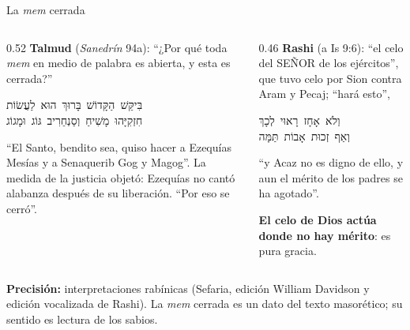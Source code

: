 \documentclass[hyperref={bookmarks=false},aspectratio=169]{beamer}
\newcommand{\heb}[1]{\mbox{\foreignlanguage{hebrew}{#1}}}
\newcommand{\SENOR}{S{\fontsize{0.78em}{1em}\selectfont EÑOR}}
\newcommand{\destacar}[1]{\textbf{\textcolor{azul}{#1}}}
\newcommand{\precision}[1]{{\footnotesize\color{gris}\textbf{Precisión:} #1}}
\begin{document}
\begin{frame}{La \emph{mem} cerrada}
\begin{columns}[t,onlytextwidth]
\begin{column}{0.52\textwidth}\small
\textbf{Talmud} (\emph{Sanedrín} 94a): ``¿Por qué toda \emph{mem} en medio de palabra es abierta, y esta es cerrada?''
\begin{center}\heb{בִּיקֵּשׁ הַקָּדוֹשׁ בָּרוּךְ הוּא לַעֲשׂוֹת}\\ \heb{חִזְקִיָּהוּ מָשִׁיחַ וְסַנְחֵרִיב גּוֹג וּמָגוֹג}\end{center}
``El Santo, bendito sea, quiso hacer a Ezequías Mesías y a Senaquerib Gog y Magog''. La medida de la justicia objetó: Ezequías no cantó alabanza después de su liberación. ``Por eso se cerró''.
\end{column}
\begin{column}{0.46\textwidth}\small
\textbf{Rashi} (a Is 9:6): ``el celo del \SENOR{} de los ejércitos'', que tuvo celo por Sion contra Aram y Pecaj; ``hará esto'',
\begin{center}\heb{וְלֹא אָחָז רָאוּי לְכָךְ}\\ \heb{וְאַף זְכוּת אָבוֹת תַּמָּה}\end{center}
``y Acaz no es digno de ello, y aun el mérito de los padres se ha agotado''.\par\smallskip
\destacar{El celo de Dios actúa donde no hay mérito}: es pura gracia.
\end{column}
\end{columns}\par\smallskip
\precision{interpretaciones rabínicas (Sefaria, edición William Davidson y edición vocalizada de Rashi). La \emph{mem} cerrada es un dato del texto masorético; su sentido es lectura de los sabios.}
\end{frame}
\end{document}
